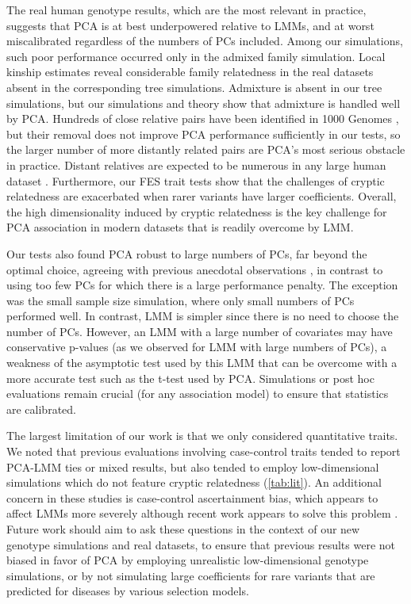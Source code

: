 \documentclass[11pt]{article}
\begin{document}
The real human genotype results, which are the most relevant in practice, suggests that PCA is at best underpowered relative to LMMs, and at worst miscalibrated regardless of the numbers of PCs included.
Among our simulations, such poor performance occurred only in the admixed family simulation.
Local kinship estimates reveal considerable family relatedness in the real datasets absent in the corresponding tree simulations.
Admixture is absent in our tree simulations, but our simulations and theory show that admixture is handled well by PCA.
Hundreds of close relative pairs have been identified in 1000 Genomes \citep{gazal_high_2015, al-khudhair_inference_2015, fedorova_atlas_2016, schlauch_identification_2017}, but their removal does not improve PCA performance sufficiently in our tests, so the larger number of more distantly related pairs are PCA's most serious obstacle in practice.
Distant relatives are expected to be numerous in any large human dataset \citep{henn_cryptic_2012, shchur_number_2018}.
Furthermore, our FES trait tests show that the challenges of cryptic relatedness are exacerbated when rarer variants have larger coefficients.
Overall, the high dimensionality induced by cryptic relatedness is the key challenge for PCA association in modern datasets that is readily overcome by LMM.

Our tests also found PCA robust to large numbers of PCs, far beyond the optimal choice, agreeing with previous anecdotal observations \citep{price_principal_2006, kang_variance_2010}, in contrast to using too few PCs for which there is a large performance penalty.
The exception was the small sample size simulation, where only small numbers of PCs performed well.
In contrast, LMM is simpler since there is no need to choose the number of PCs.
However, an LMM with a large number of covariates may have conservative p-values (as we observed for LMM with large numbers of PCs), a weakness of the asymptotic test used by this LMM that can be overcome with a more accurate test such as the t-test used by PCA.
Simulations or post hoc evaluations remain crucial (for any association model) to ensure that statistics are calibrated.

The largest limitation of our work is that we only considered quantitative traits.
We noted that previous evaluations involving case-control traits tended to report PCA-LMM ties or mixed results, but also tended to employ low-dimensional simulations which do not feature cryptic relatedness (\cref{tab:lit}).
An additional concern in these studies is case-control ascertainment bias, which appears to affect LMMs more severely although recent work appears to solve this problem \citep{yang_advantages_2014, zhou_efficiently_2018}.
Future work should aim to ask these questions in the context of our new genotype simulations and real datasets, to ensure that previous results were not biased in favor of PCA by employing unrealistic low-dimensional genotype simulations, or by not simulating large coefficients for rare variants that are predicted for diseases by various selection models.
\end{document}

